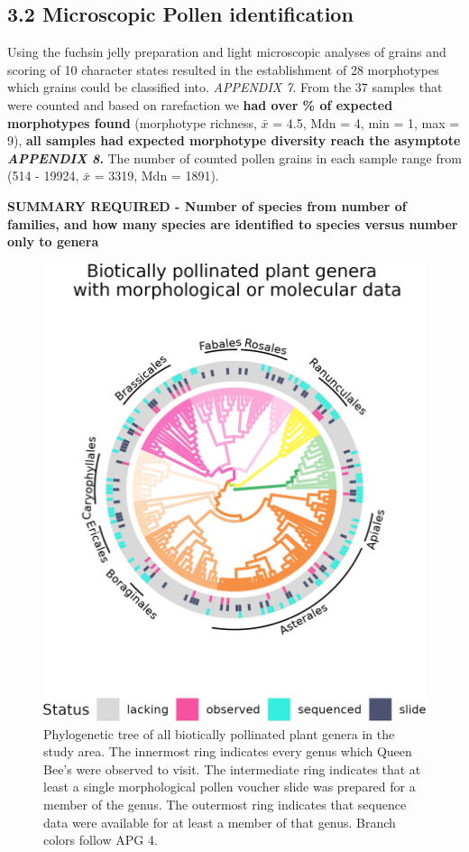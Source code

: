 \documentclass[
]{article}
\begin{document}
\hypertarget{microscopic-pollen-identification}{%
\subsection{3.2 \textbar{} Microscopic Pollen
identification}\label{microscopic-pollen-identification}}

Using the fuchsin jelly preparation and light microscopic analyses of
grains and scoring of 10 character states resulted in the establishment
of 28 morphotypes which grains could be classified into. \emph{APPENDIX
7}. From the 37 samples that were counted and based on rarefaction we
\textbf{had over \% of expected morphotypes found} (morphotype richness,
\(\bar{x}\) = 4.5, Mdn = 4, min = 1, max = 9), \textbf{all samples had
expected morphotype diversity reach the asymptote \emph{APPENDIX 8}.}
The number of counted pollen grains in each sample range from (514 -
19924, \(\bar{x}\) = 3319, Mdn = 1891).

\textbf{SUMMARY REQUIRED - Number of species from number of families,
and how many species are identified to species versus number only to
genera }

\begin{figure}
\includegraphics[width=0.65\linewidth]{../graphics/plots/rmbl_draft_tree} \caption{Phylogenetic tree of all biotically pollinated plant genera in the study area. The innermost ring indicates every genus which Queen Bee's were observed to visit. The intermediate ring indicates that at least a single morphological pollen voucher slide was prepared for a member of the genus. The outermost ring indicates that sequence data were available for at least a member of that genus. Branch colors follow APG 4.}\label{fig:Sequence and Morphological Vouchers}
\end{figure}
\end{document}
